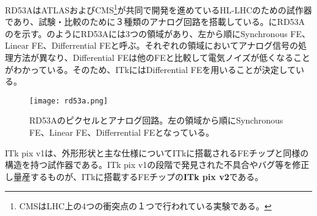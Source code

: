 RD53AはATLASおよびCMS\footnote{CMSはLHC上の4つの衝突点の１つで行われている実験である。}が共同で開発を進めているHL-LHCのための試作器であり、試験・比較のために３種類のアナログ回路を搭載している。にRD53Aのを示す。のようにRD53Aには3つの領域があり、左から順にSynchronous FE、Linear FE、Differrential FEと呼ぶ。それぞれの領域においてアナログ信号の処理方法が異なり、Differential FEは他のFEと比較して電気ノイズが低くなることがわかっている。そのため、ITkにはDifferential FEを用いることが決定している。

\begin{figure}[tbp]
  \centering
  \texttt{[image: rd53a.png]}
  \caption[RD53Aのピクセルとアナログ回路]{RD53Aのピクセルとアナログ回路\cite{rd53a}。左の領域から順にSynchronous FE、Linear FE、Differrential FEとなっている。}
  \label{fig:rd53a}
\end{figure}

ITk pix v1は、外形形状と主な仕様についてITkに搭載されるFEチップと同様の構造を持つ試作器である。ITk pix v1の段階で発見された不具合やバグ等を修正し量産するものが、ITkに搭載するFEチップの\textbf{ITk pix v2}である。



